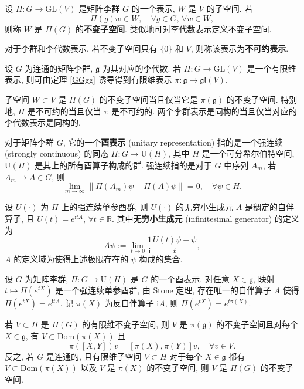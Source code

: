 \begin{definition}[不变子空间]
    设 $ \Pi:G\to\mathrm{GL}(V) $ 是矩阵李群 $ G $ 的一个表示, $ W $ 是 $ V $ 的子空间. 若
    \[ \Pi(g)w\in W,\quad\forall g\in G,\,\forall w\in W, \]
    则称 $ W $ 是 $ \Pi(G) $ 的{\bf 不变子空间}. 类似地可对李代数表示定义不变子空间.
\end{definition}
\begin{definition}[不可约表示]
    对于李群和李代数表示, 若不变子空间只有 $ \{0\} $ 和 $ V $, 则称该表示为{\bf 不可约表示}.
\end{definition}

\begin{proposition}
    设 $ G $ 为连通的矩阵李群, $ \mathfrak{g} $ 为其对应的李代数. 若 $ \Pi:G\to\mathrm{GL}(V) $ 是一个有限维表示, 则可由定理 \ref{GGgg} 诱导得到有限维表示 $ \pi:\mathfrak{g}\to\mathfrak{gl}(V) $.

    子空间 $ W\subset V $ 是 $ \Pi(G) $ 的不变子空间当且仅当它是 $ \pi(\mathfrak{g}) $ 的不变子空间. 特别地, $ \Pi $ 是不可约的当且仅当 $ \pi $ 是不可约的. 两个李群表示是同构的当且仅当对应的李代数表示是同构的.
\end{proposition}

\begin{definition}[酉表示]
    \label{unitary representation 1}
    对于矩阵李群 $ G $, 它的一个{\bf 酉表示} (unitary representation) 指的是一个强连续 (strongly continuous) 的同态 $ \Pi:G\to\mathrm{U}(H) $, 其中 $ H $ 是一个可分希尔伯特空间, $ \mathrm{U}(H) $ 是其上的所有酉算子构成的群. 强连续指的是对于 $ G $ 中序列 $ A_m $, 若 $ A_m\to A\in G $, 则
    \[ \lim_{m\to\infty}\|\Pi(A_m)\psi-\Pi(A)\psi\|=0,\quad\forall \psi\in H. \]
\end{definition}

\begin{theorem}
    设 $ U(\cdot) $ 为 $ H $ 上的强连续单参酉群, 则 $ U(\cdot) $ 的无穷小生成元 $ A $ 是稠定的自伴算子, 且 $ U(t)=e^{\mathrm{i}tA} $, $ \forall t\in\mathbb{R} $. 其中{\bf 无穷小生成元} (infinitesimal generator) 的定义为
    \[ A\psi:=\lim_{t\to 0}\frac{1}{\mathrm{i}}\frac{U(t)\psi-\psi}{t}, \]
    $ A $ 的定义域为使得上述极限存在的 $ \psi $ 构成的集合.
\end{theorem}

\begin{proposition}
    \label{unitary representation 2}
    设 $ G $ 为矩阵李群, $ \Pi:G\to\mathrm{U}(H) $ 是 $ G $ 的一个酉表示. 对任意 $ X\in\mathfrak{g} $, 映射 $ t\mapsto\Pi(e^{tX}) $ 是一个强连续单参酉群, 由 Stone 定理, 存在唯一的自伴算子 $ A $ 使得 $ \Pi(e^{tX})=e^{\mathrm{i}tA} $. 记 $ \pi(X) $ 为反自伴算子 $ \mathrm{i}A $, 则 $\Pi(e^{tX})=e^{t\pi(X)}$.

    若 $ V\subset H $ 是 $ \Pi(G) $ 的有限维不变子空间, 则 $ V $ 是 $ \pi(\mathfrak{g}) $ 的不变子空间且对每个 $ X\in\mathfrak{g} $, 有 $ V\subset\mathrm{Dom}(\pi(X)) $ 且
    \[ \pi([X,Y])v=[\pi(X),\pi(Y)]v,\quad\forall v\in V. \]
    反之, 若 $ G $ 是连通的, 且有限维子空间 $ V\subset H $ 对于每个 $ X\in\mathfrak{g} $ 都有 $ V\subset\mathrm{Dom}(\pi(X)) $ 以及 $ V $ 是 $ \pi(X) $ 的不变子空间, 则 $ V $ 是 $ \Pi(G) $ 的不变子空间. 
\end{proposition}